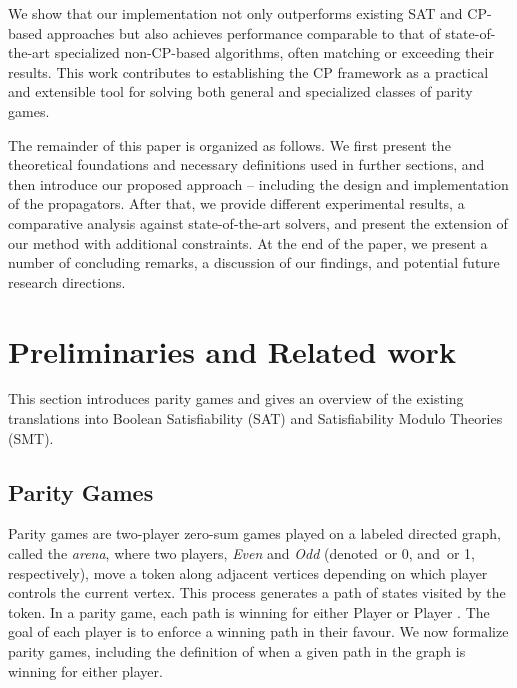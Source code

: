 \documentclass[letterpaper]{article} %
\begin{document}
We show that our implementation not only outperforms existing SAT and CP-based approaches but also achieves performance comparable to that of state-of-the-art specialized non-CP-based algorithms, often matching or exceeding their results. This work contributes to establishing the CP framework as a practical and extensible tool for solving both general and specialized classes of parity games.

The remainder of this paper is organized as follows. We first present the theoretical foundations and necessary definitions used in further sections, and then introduce our proposed approach -- including the design and implementation of the \noc propagators. After that, we provide different experimental results, a comparative analysis against state-of-the-art solvers, and present the extension of our method with additional constraints. At the end of the paper, we present a number of concluding remarks, a discussion of our findings, and potential future research directions.

\section{Preliminaries and Related work}

This section introduces parity games and gives an overview of the existing translations into Boolean Satisfiability (SAT) and Satisfiability Modulo Theories (SMT).

\subsection{Parity Games}

Parity games are two-player zero-sum games played on a labeled directed graph, called the \textit{arena}, where two players, \textit{Even} and \textit{Odd} (denoted~\even or 0, and~\odd or 1, respectively), move a token along adjacent vertices depending on which player controls the current vertex. This process generates a path of states visited by the token. In a parity game, each path is winning for either Player \even or Player \odd. The goal of each player is to enforce a winning path in their favour. We now formalize parity games, including the definition of when a given path in the graph is winning for either player.
\end{document}
